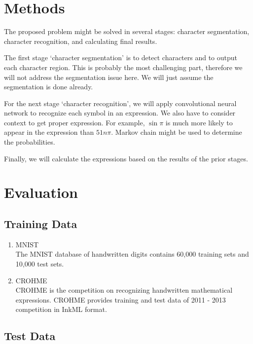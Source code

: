 \documentclass[10pt,twocolumn,letterpaper]{article}
\begin{document}
\section{Methods}

The proposed problem might be solved in several stages:
character segmentation, character recognition, and calculating final results.

The first stage `character segmentation' is to detect characters and to output each character region.
This is probably the most challenging part, therefore we will not address the segmentation issue here.
We will just assume the segmentation is done already. 

For the next stage `character recognition',
we will apply convolutional neural network to recognize each symbol in an expression.
We also have to consider context to get proper expression. For example, $\sin \pi$ is much more likely to appear in the expression than $51n \pi$. Markov chain might be used to determine the probabilities.

Finally, we will calculate the expressions based on the results of the prior stages.

\section{Evaluation}


\subsection{Training Data}

\begin{enumerate}
\item MNIST \cite{MNIST} \\
The MNIST database of handwritten digits contains 60,000 training sets and 10,000 test sets.

\item CROHME \cite{CROHME} \\
CROHME is the competition on recognizing handwritten mathematical expressions. CROHME provides training and test data of 2011 - 2013 competition in InkML format.

\end{enumerate}

\subsection{Test Data}
\end{document}
